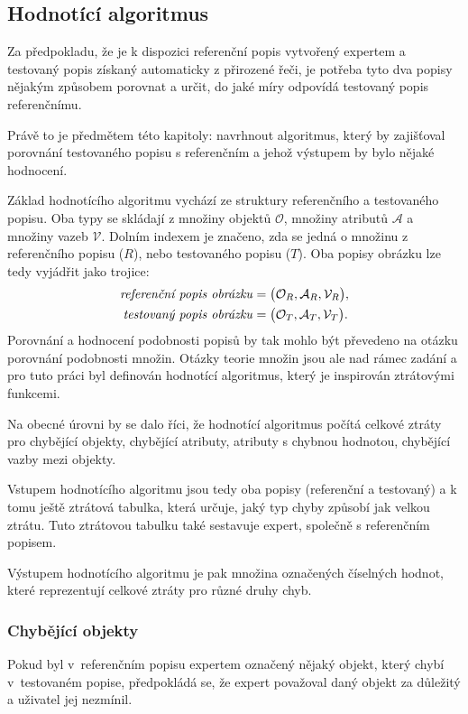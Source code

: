 \subsection{Hodnotící algoritmus}\label{subsec:hodnoceni}
Za předpokladu, že je k dispozici referenční popis vytvořený expertem a testovaný popis získaný automaticky z přirozené řeči,
je potřeba tyto dva popisy nějakým způsobem porovnat a určit, do jaké míry odpovídá testovaný popis referenčnímu.

Právě to je předmětem této kapitoly: navrhnout algoritmus, který by zajišťoval porovnání testovaného popisu s referenčním a jehož výstupem by bylo nějaké hodnocení.

Základ hodnotícího algoritmu vychází ze struktury referenčního a testovaného popisu.
Oba typy se skládají z množiny objektů $\mathcal O$, množiny atributů $\mathcal A$ a množiny vazeb $\mathcal V$.
Dolním indexem je značeno, zda se jedná o množinu z referenčního popisu ($R$), nebo testovaného popisu ($T$).
Oba popisy obrázku lze tedy vyjádřit jako trojice:
\begin{align*}
	\text{\emph{referenční popis obrázku}} & = \bigl( \mathcal{O}_{R}, \mathcal{A}_{R}, \mathcal{V}_{R} \bigr), \\
	\text{\emph{testovaný popis obrázku}}  & = \bigl( \mathcal{O}_{T}, \mathcal{A}_{T}, \mathcal{V}_{T} \bigr).
\end{align*}
Porovnání a hodnocení podobnosti popisů by tak mohlo být převedeno na otázku porovnání podobnosti množin.
Otázky teorie množin jsou ale nad rámec zadání a pro tuto práci byl definován hodnotící algoritmus,
který je inspirován ztrátovými funkcemi.

Na obecné úrovni by se dalo říci, že hodnotící algoritmus počítá celkové ztráty pro chybějící objekty,
chybějící atributy, atributy s chybnou hodnotou, chybějící vazby mezi objekty.

Vstupem hodnotícího algoritmu jsou tedy oba popisy (referenční a testovaný) a k tomu ještě ztrátová tabulka,
která určuje, jaký typ chyby způsobí jak velkou ztrátu.
Tuto ztrátovou tabulku také sestavuje expert, společně s referenčním popisem.

Výstupem hodnotícího algoritmu je pak množina označených číselných hodnot, které reprezentují celkové ztráty pro různé druhy chyb.

\subsubsection{Chybějící objekty}
Pokud byl v~referenčním popisu expertem označený nějaký objekt,
který chybí v~testovaném popise, předpokládá se, že expert považoval daný objekt za důležitý a uživatel jej nezmínil.

